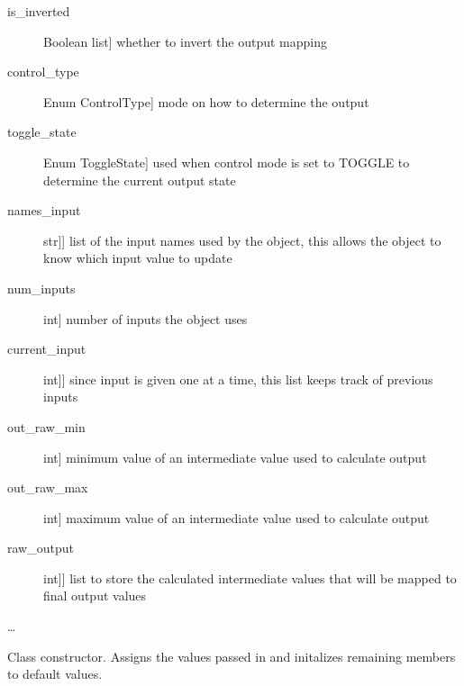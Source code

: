 \documentclass[letterpaper,10pt,english]{sphinxmanual}
\begin{document}
\begin{fulllineitems}
\begin{description}
\item[{is\_inverted}] \leavevmode{[}Boolean list{]}
\sphinxAtStartPar
whether to invert the output mapping

\item[{control\_type}] \leavevmode{[}Enum ControlType{]}
\sphinxAtStartPar
mode on how to determine the output

\item[{toggle\_state}] \leavevmode{[}Enum ToggleState{]}
\sphinxAtStartPar
used when control mode is set to TOGGLE to determine the current output state

\item[{names\_input}] \leavevmode{[}{[}str{]}{]}
\sphinxAtStartPar
list of the input names used by the object, this allows the object to know which input value to update

\item[{num\_inputs}] \leavevmode{[}int{]}
\sphinxAtStartPar
number of inputs the object uses

\item[{current\_input}] \leavevmode{[}{[}int{]}{]}
\sphinxAtStartPar
since input is given one at a time, this list keeps track of previous inputs

\item[{out\_raw\_min}] \leavevmode{[}int{]}
\sphinxAtStartPar
minimum value of an intermediate value used to calculate output

\item[{out\_raw\_max}] \leavevmode{[}int{]}
\sphinxAtStartPar
maximum value of an intermediate value used to calculate output

\item[{raw\_output}] \leavevmode{[}{[}int{]}{]}
\sphinxAtStartPar
list to store the calculated intermediate values that will be mapped to final output values

\end{description}

\sphinxAtStartPar
…

\sphinxAtStartPar
{}

\begin{fulllineitems}
\label{\detokenize{specific:EarOutput.EarOutput.__init__}}
\sphinxAtStartPar
Class constructor. Assigns the values passed in and initalizes remaining members to default values.


\end{fulllineitems}
\end{fulllineitems}
\end{document}
